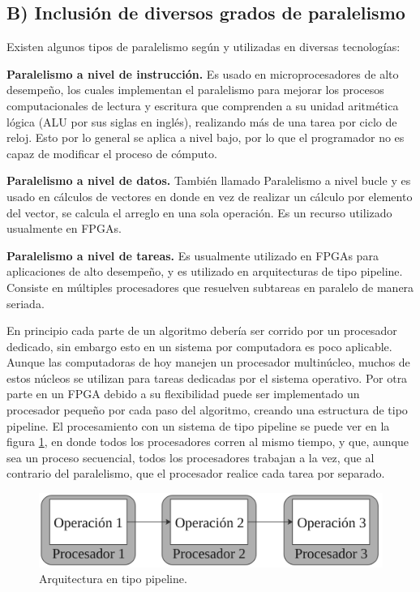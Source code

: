 \documentclass[twoside,spanish,ESP,MSc]{plantillaLabUPV}
\theoremstyle{definition}
\begin{document}
\subsection*{B) Inclusión de diversos grados de paralelismo}

Existen algunos tipos de paralelismo según \cite{paralel} y \cite{paralel2} utilizadas en diversas tecnologías:

\checkmark\textbf{Paralelismo a nivel de instrucción.} Es usado en microprocesadores de alto desempeño, los cuales implementan el paralelismo para mejorar los procesos computacionales de lectura y escritura que comprenden a su unidad aritmética lógica (ALU por sus siglas en inglés), realizando más de una tarea por ciclo de reloj. Esto por lo general se aplica a nivel bajo, por lo que el programador no es capaz de modificar el proceso de cómputo.

\checkmark\textbf{Paralelismo a nivel de datos.} También llamado Paralelismo a nivel bucle y es usado en cálculos de vectores en donde en vez de realizar un cálculo por elemento del vector, se calcula el arreglo en una sola operación. Es un recurso utilizado usualmente en FPGAs.

\checkmark\textbf{Paralelismo a nivel de tareas.} Es usualmente utilizado en FPGAs para aplicaciones de alto desempeño, y es utilizado en arquitecturas de tipo pipeline. Consiste en múltiples procesadores que resuelven subtareas en paralelo de manera seriada.

En principio cada parte de un algoritmo debería ser corrido por un procesador dedicado, sin embargo esto en un sistema por computadora es poco aplicable. Aunque las computadoras de hoy manejen un procesador multinúcleo, muchos de estos núcleos se utilizan para tareas dedicadas por el sistema operativo. Por otra parte en un FPGA debido a su flexibilidad puede ser implementado un procesador pequeño por cada paso del algoritmo, creando una estructura de tipo pipeline. El procesamiento con un sistema de tipo pipeline se puede ver en la figura \ref{pipe}, en donde todos los procesadores corren al mismo tiempo, y que, aunque sea un proceso secuencial, todos los procesadores trabajan a la vez, que al contrario del paralelismo, que el procesador realice cada tarea por separado.

 
\begin{figure}[!tbh]
	\centering
	\includegraphics[scale=0.4]{edrawimas/pipe}
	\caption{Arquitectura en tipo pipeline. 
		\label{pipe}}
\end{figure}
\end{document}
